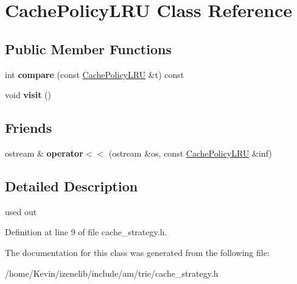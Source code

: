\hypertarget{classCachePolicyLRU}{
\section{CachePolicyLRU Class Reference}
\label{classCachePolicyLRU}
}
\subsection*{Public Member Functions}
\begin{CompactItemize}
\item 
\hypertarget{classCachePolicyLRU_d3169bab1cc6335410bcc6ed9d3d02ee}{
int \textbf{compare} (const \hyperlink{classCachePolicyLRU}{CachePolicyLRU} \&t) const }
\label{classCachePolicyLRU_d3169bab1cc6335410bcc6ed9d3d02ee}

\item 
\hypertarget{classCachePolicyLRU_53ba43ca2cf1852ae6724a681f576927}{
void \textbf{visit} ()}
\label{classCachePolicyLRU_53ba43ca2cf1852ae6724a681f576927}

\end{CompactItemize}
\subsection*{Friends}
\begin{CompactItemize}
\item 
\hypertarget{classCachePolicyLRU_007bcb42478e9f92801693b561d6e686}{
ostream \& \textbf{operator$<$$<$} (ostream \&os, const \hyperlink{classCachePolicyLRU}{CachePolicyLRU} \&inf)}
\label{classCachePolicyLRU_007bcb42478e9f92801693b561d6e686}

\end{CompactItemize}


\subsection{Detailed Description}
used out 

Definition at line 9 of file cache\_\-strategy.h.

The documentation for this class was generated from the following file:\begin{CompactItemize}
\item 
/home/Kevin/izenelib/include/am/trie/cache\_\-strategy.h\end{CompactItemize}
